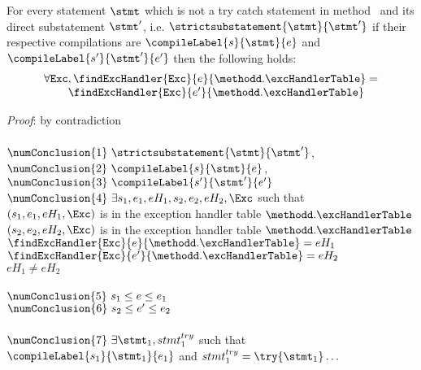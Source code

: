 \begin{compProp8A}
  For every statement $\stmt$ which is not a try catch statement  in method \methodd \  and  its direct substatement $\stmt'$, i.e. 
$\strictsubstatement{\stmt}{\stmt'} $
if their respective compilations are  $\compileLabel{s}{\stmt}{e}$ and  $\compileLabel{s'}{\stmt'}{e'}$ then the following holds:
$$ \begin{array}{l}
          \forall \mbox{\rm\tt{Exc}}, \findExcHandler{\mbox{\rm\tt{Exc}} }{e}{\methodd.\excHandlerTable} = \\
	  \phantom{\forall \mbox{\rm\tt{Exc}} }\findExcHandler{\mbox{\rm\tt{Exc}} }{e'}{\methodd.\excHandlerTable} 
   \end{array}
$$
\end{compProp8A}
\textit{Proof}: by contradiction \\
 \\
$\numConclusion{1} \ \strictsubstatement{\stmt}{\stmt'}   $, \\
$\numConclusion{2} \ \compileLabel{s}{\stmt}{e}$,\\
$\numConclusion{3} \ \compileLabel{s'}{\stmt'}{e'}$ \\
$\numConclusion{4} \ \exists s_1, e_1, eH_1, s_2, e_2, eH_2, \Exc $ such that\\
   $ (s_1,e_1, eH_1, \Exc )$ is in the exception handler table $\methodd.\excHandlerTable$\\
   $ (s_2,e_2, eH_2, \Exc )$ is in the exception handler table $\methodd.\excHandlerTable$\\
   $\findExcHandler{\mbox{\rm\tt{Exc}} }{e}{\methodd.\excHandlerTable} = eH_1$  \\
   $\findExcHandler{\mbox{\rm\tt{Exc}} }{e'}{\methodd.\excHandlerTable} = eH_2$  \\
   $ eH_1 \neq  eH_2  $ \\
 \\
$\numConclusion{5} \  s_1 \le e \le e_1$ \\
$\numConclusion{6} \  s_2 \le e' \le e_2$ \\
 \\
$\numConclusion{7} \ \exists \stmt_1, stmt^{try}_1 $ such that $  \compileLabel{s_1}{\stmt_1}{e_1}$ and $  stmt^{try}_1 = \try\{ \stmt_1\} \ldots $ \\
